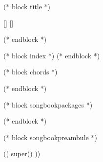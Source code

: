 (* block title *)
    \setmainfont[
        Path = fonts/Lato/,
        Extension = .ttf,
        BoldFont = Lato-Bold,
        ItalicFont = Lato-Italic,
        BoldItalicFont = Lato-BoldItalic]{Lato-Regular}
    \begin{titlepage}
    \begin{center}
    \raisebox{-0.5\totalheight}[\totalheight]{}
    \raisebox{-0.5\totalheight}[\totalheight]{}
    \end{center}
    \end{titlepage}
    \newpage
    \null
    \newpage
(* endblock *)

(* block index *)
(* endblock *)

(* block chords *)
    
(* endblock *)

(* block songbookpackages *)
\usepackage[
    (* for option in _bookoptions *)((option)),
    (* endfor *)
    ]{crepbook}
(* endblock *)

(* block songbookpreambule *)
\usepackage{fontspec}
\usepackage[
     a5paper %
     ,hmarginratio=1:1 %
     ,outer=1.8cm %
     ,vmarginratio=1:1 %
     ,bmargin=1.3cm %
     ,landscape
     ]{geometry}

(( super() ))

\pagestyle{empty}
\setcounter{songnum}{1}

